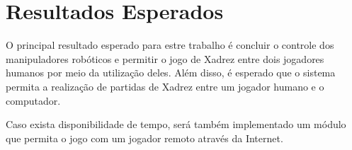 \chapter[Resultados Esperados]{Resultados Esperados}
\label{cap:resultados_esperados}

O principal resultado esperado para estre trabalho é concluir o controle dos manipuladores robóticos e permitir o jogo de Xadrez entre dois jogadores humanos por meio da utilização deles.
Além disso, é esperado que o sistema permita a realização de partidas de Xadrez entre um jogador humano e o computador.

Caso exista disponibilidade de tempo, será também implementado um módulo que permita o jogo com um jogador remoto através da Internet.